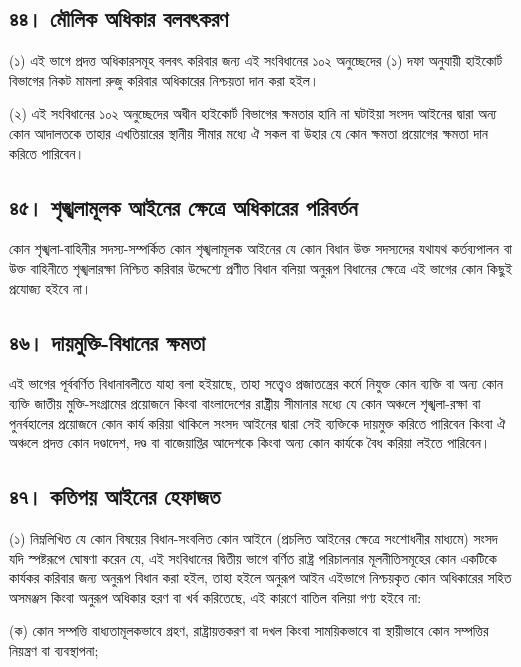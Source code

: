 \documentclass[11pt]{article}
\begin{document}
\subsection{৪৪। মৌলিক অধিকার বলবৎকরণ}
\label{sec:org4e31240}
(১) এই ভাগে প্রদত্ত অধিকারসমূহ বলবৎ করিবার জন্য এই সংবিধানের ১০২ অনুচ্ছেদের
    (১) দফা অনুযায়ী হাইকোর্ট বিভাগের নিকট মামলা রুজু করিবার অধিকারের নিশ্চয়তা
    দান করা হইল।

(২) এই সংবিধানের ১০২ অনুচ্ছেদের অধীন হাইকোর্ট বিভাগের ক্ষমতার হানি না
    ঘটাইয়া সংসদ আইনের দ্বারা অন্য কোন আদালতকে তাহার এখতিয়ারের স্থানীয় সীমার
    মধ্যে ঐ সকল বা উহার যে কোন ক্ষমতা প্রয়োগের ক্ষমতা দান করিতে পারিবেন।

\subsection{৪৫। শৃঙ্খলামূলক আইনের ক্ষেত্রে অধিকারের পরিবর্তন}
\label{sec:orgdf371ac}
কোন শৃঙ্খলা-বাহিনীর সদস্য-সম্পর্কিত কোন শৃঙ্খলামূলক আইনের যে কোন বিধান উক্ত
সদস্যদের যথাযথ কর্তব্যপালন বা উক্ত বাহিনীতে শৃঙ্খলারক্ষা নিশ্চিত করিবার
উদ্দেশ্যে প্রণীত বিধান বলিয়া অনুরূপ বিধানের ক্ষেত্রে এই ভাগের কোন কিছুই প্রযোজ্য
হইবে না।

\subsection{৪৬। দায়মুক্তি-বিধানের ক্ষমতা}
\label{sec:org355bfe0}
এই ভাগের পূর্ববর্ণিত বিধানাবলীতে যাহা বলা হইয়াছে, তাহা সত্ত্বেও প্রজাতন্ত্রের
কর্মে নিযুক্ত কোন ব্যক্তি বা অন্য কোন ব্যক্তি জাতীয় মুক্তি-সংগ্রামের প্রয়োজনে
কিংবা বাংলাদেশের রাষ্ট্রীয় সীমানার মধ্যে যে কোন অঞ্চলে শৃঙ্খলা-রক্ষা বা
পুনর্বহালের প্রয়োজনে কোন কার্য করিয়া থাকিলে সংসদ আইনের দ্বারা সেই ব্যক্তিকে
দায়মুক্ত করিতে পারিবেন কিংবা ঐ অঞ্চলে প্রদত্ত কোন দণ্ডাদেশ, দণ্ড বা
বাজেয়াপ্তির আদেশকে কিংবা অন্য কোন কার্যকে বৈধ করিয়া লইতে পারিবেন।

\subsection{৪৭। কতিপয় আইনের হেফাজত}
\label{sec:orge3478a7}
(১) নিম্নলিখিত যে কোন বিষয়ের বিধান-সংবলিত কোন আইনে (প্রচলিত আইনের ক্ষেত্রে
    সংশোধনীর মাধ্যমে) সংসদ যদি স্পষ্টরূপে ঘোষণা করেন যে, এই সংবিধানের দ্বিতীয়
    ভাগে বর্ণিত রাষ্ট্র পরিচালনার মূলনীতিসমূহের কোন একটিকে কার্যকর করিবার জন্য
    অনুরূপ বিধান করা হইল, তাহা হইলে অনুরূপ আইন এইভাগে নিশ্চয়কৃত কোন অধিকারের
    সহিত অসমঞ্জস কিংবা অনুরূপ অধিকার হরণ বা খর্ব করিতেছে, এই কারণে বাতিল বলিয়া
    গণ্য হইবে না:

(ক) কোন সম্পত্তি বাধ্যতামূলকভাবে গ্রহণ, রাষ্ট্রায়ত্তকরণ বা দখল কিংবা
    সাময়িকভাবে বা স্থায়ীভাবে কোন সম্পত্তির নিয়ন্ত্রণ বা ব্যবস্থাপনা;
\end{document}
